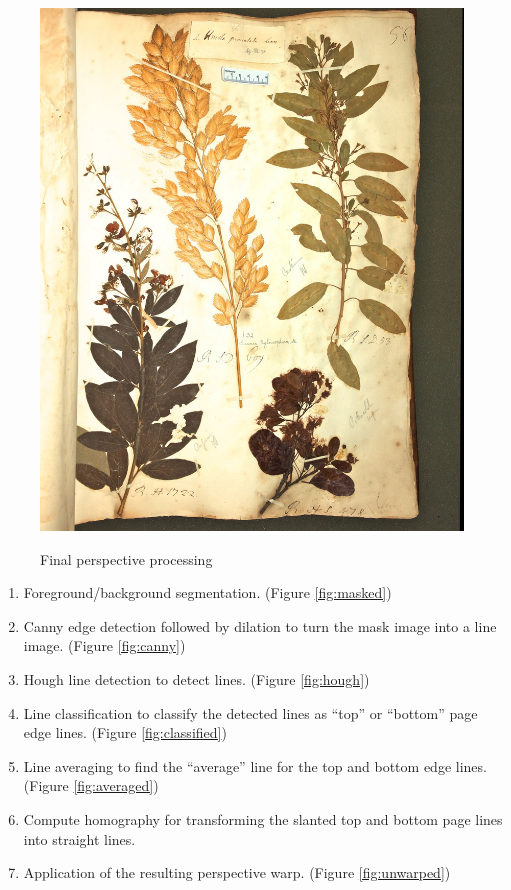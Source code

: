 \documentclass[a4paper]{llncs}
\begin{document}
\begin{figure}[htbm]
{  \includegraphics[height=.35\textheight]{figures-downsampled/Catesby_HS232_056_0602-unwarped-stretch.jpg}
  \label{fig:unwarped}
  }
  \caption{Final perspective processing}\label{fig:final}
\end{figure}

\begin{figure}[htbm]
  
\end{figure}

\begin{enumerate}
  \item Foreground/background segmentation. (Figure \ref{fig:masked})
  \item Canny edge detection followed by dilation to turn the mask image into a line image. (Figure \ref{fig:canny})
  \item Hough line detection to detect lines. (Figure \ref{fig:hough})
  \item Line classification to classify the detected lines as “top” or “bottom” page edge lines. (Figure \ref{fig:classified})
  \item Line averaging to find the “average” line for the top and bottom edge lines. (Figure \ref{fig:averaged})
  \item Compute homography for transforming the slanted top and bottom page lines into straight lines.
  \item Application of the resulting perspective warp. (Figure \ref{fig:unwarped})
\end{enumerate}
\end{document}
